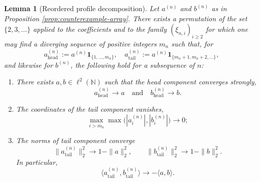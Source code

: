 \documentclass[11pt]{amsart}
\newtheorem{lemma}[theorem]{Lemma}
\begin{document}
\begin{lemma}[Reordered profile decomposition]\label{lem:profile}
Let $a^{(n)}$ and $b^{(n)}$ as in Proposition \ref{prop:counterexample-array}. There exists a permutation of the set $\{2,3,\dots\}$ applied to the coefficients and to the family
$(\xi_{n,i})_{i \ge 2}$ for which one may find 
a diverging sequence of positive integers $m_n$ such that, for
\[
a^{(n)}_{\mathrm{head}} := a^{(n)} \mathbf{1}_{\{1,\dots,m_n\}},
\quad
a^{(n)}_{\mathrm{tail}} := a^{(n)} \mathbf{1}_{\{m_n+1,m_n+2,\dots\}},
\]
and likewise for $b^{(n)}$, the following hold for a subsequence of $n$:
\begin{enumerate}
\renewcommand{\labelenumi}{\Roman{enumi}.}
\item There exists $a,b \in \ell^2(\mathbb{N})$ such that the head component converges strongly,
\[
a^{(n)}_{\mathrm{head}} \to a \quad \text{and} \quad b^{(n)}_{\mathrm{head}} \to b.
\]
\item The coordinates of the tail component vanishes,
\[
\max_{i > m_n} \max\bigl( |a_i^{(n)}|, |b_i^{(n)}| \bigr) \longrightarrow 0;
\]
\medskip

\item The norms of tail component converge
\[
\|a^{(n)}_{\mathrm{tail}}\|_2^2 \longrightarrow 1-\|a\|_2^2,
\qquad
\|b^{(n)}_{\mathrm{tail}}\|_2^2 \longrightarrow 1-\|b\|_2^2.
\]
In particular,
\[
\langle a^{(n)}_{\mathrm{tail}}, b^{(n)}_{\mathrm{tail}} \rangle
\longrightarrow
- \langle a,b \rangle.
\]
\end{enumerate}
\end{lemma}
\end{document}
